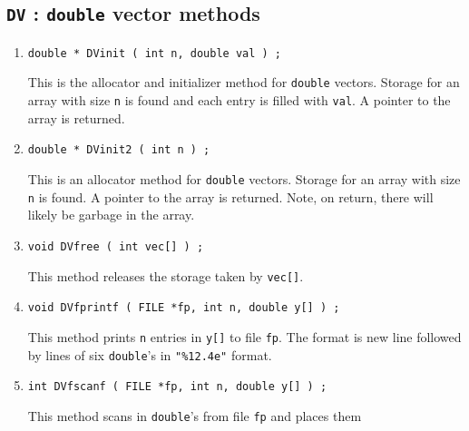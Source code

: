 \par
\subsection{{\tt DV} : {\tt double} vector methods}
\label{subsection:Utilities:proto:DV}
\par
\begin{enumerate}
\item
\begin{verbatim}
double * DVinit ( int n, double val ) ;
\end{verbatim}
This is the allocator and initializer method for {\tt double} vectors.
Storage for an array with size {\tt n} is found and each
entry is filled with {\tt val}.
A pointer to the array is returned.
\item
\begin{verbatim}
double * DVinit2 ( int n ) ;
\end{verbatim}
This is an allocator method for {\tt double} vectors.
Storage for an array with size {\tt n} is found.
A pointer to the array is returned.
Note, on return, there will likely be garbage in the array.
\item
\begin{verbatim}
void DVfree ( int vec[] ) ;
\end{verbatim}
This method releases the storage taken by {\tt vec[]}.
\item
\begin{verbatim}
void DVfprintf ( FILE *fp, int n, double y[] ) ;
\end{verbatim}
This method prints {\tt n} entries in {\tt y[]} to file {\tt fp}.
The format is new line followed by lines of six {\tt double}'s in
{\tt "\%12.4e"} format.
\item
\begin{verbatim}
int DVfscanf ( FILE *fp, int n, double y[] ) ;
\end{verbatim}
This method scans in {\tt double}'s from file {\tt fp} and places them

\end{enumerate}
